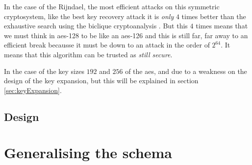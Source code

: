 \documentclass[10pt,a4paper,twoside]{llncs}
\begin{document}
In the case of the Rijndael, the most efficient attacks on this symmetric cryptosystem, like the best key recovery attack it is \emph{only} $4$ times better than the exhaustive search using the biclique cryptoanalysis \cite{biclique-fullaes}. But this $4$ times means that we must think in aes-128 to be like an aes-126 and this is still far, far away to an efficient break becausse it must be down to an attack in the order of $2^{64}$. It means that this algorithm can be trusted as \emph{still secure}.

In the case of the key sizes $192$ and $256$ of the aes, and due to a weakness on the design of the key expansion, but this will be explained in section \ref{sec:keyExpansion}.


\subsection{Design}

\section{Generalising the schema}
\end{document}
